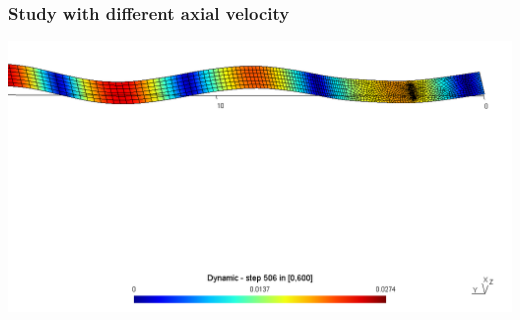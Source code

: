 \documentclass[9pt]{beamer}
\begin{document}
\begin{frame}
\frametitle{Study with different axial velocity}


\begin{figure}
\end{figure}

\href{run:movie1.mpg}{\includegraphics[width=1.0\textwidth,trim={0cm 15cm 0cm 1cm},clip]{ParaStudy_onlydata/dir.png}}




\end{frame}
\end{document}
